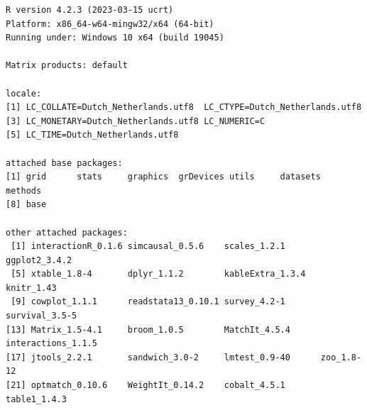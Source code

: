 \documentclass[
  letterpaper,
  DIV=11,
  numbers=noendperiod]{scrreprt}
\begin{document}
\begin{verbatim}
R version 4.2.3 (2023-03-15 ucrt)
Platform: x86_64-w64-mingw32/x64 (64-bit)
Running under: Windows 10 x64 (build 19045)

Matrix products: default

locale:
[1] LC_COLLATE=Dutch_Netherlands.utf8  LC_CTYPE=Dutch_Netherlands.utf8   
[3] LC_MONETARY=Dutch_Netherlands.utf8 LC_NUMERIC=C                      
[5] LC_TIME=Dutch_Netherlands.utf8    

attached base packages:
[1] grid      stats     graphics  grDevices utils     datasets  methods  
[8] base     

other attached packages:
 [1] interactionR_0.1.6 simcausal_0.5.6    scales_1.2.1       ggplot2_3.4.2     
 [5] xtable_1.8-4       dplyr_1.1.2        kableExtra_1.3.4   knitr_1.43        
 [9] cowplot_1.1.1      readstata13_0.10.1 survey_4.2-1       survival_3.5-5    
[13] Matrix_1.5-4.1     broom_1.0.5        MatchIt_4.5.4      interactions_1.1.5
[17] jtools_2.2.1       sandwich_3.0-2     lmtest_0.9-40      zoo_1.8-12        
[21] optmatch_0.10.6    WeightIt_0.14.2    cobalt_4.5.1       table1_1.4.3      


\end{verbatim}
\end{document}
